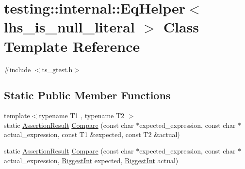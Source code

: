 \hypertarget{classtesting_1_1internal_1_1EqHelper}{\section{testing\-:\-:internal\-:\-:Eq\-Helper$<$ lhs\-\_\-is\-\_\-null\-\_\-literal $>$ Class Template Reference}
\label{classtesting_1_1internal_1_1EqHelper}
}


{\ttfamily \#include $<$ts\-\_\-gtest.\-h$>$}

\subsection*{Static Public Member Functions}
\begin{DoxyCompactItemize}
\item 
{\footnotesize template$<$typename T1 , typename T2 $>$ }\\static \hyperlink{classtesting_1_1AssertionResult}{Assertion\-Result} \hyperlink{classtesting_1_1internal_1_1EqHelper_ac2977ed90cd3c88607f804e43b86b92c}{Compare} (const char $\ast$expected\-\_\-expression, const char $\ast$actual\-\_\-expression, const T1 \&expected, const T2 \&actual)
\item 
static \hyperlink{classtesting_1_1AssertionResult}{Assertion\-Result} \hyperlink{classtesting_1_1internal_1_1EqHelper_a3de996954b41d484c065ed824fe7eac9}{Compare} (const char $\ast$expected\-\_\-expression, const char $\ast$actual\-\_\-expression, \hyperlink{namespacetesting_1_1internal_a05c6bd9ede5ccdf25191a590d610dcc6}{Biggest\-Int} expected, \hyperlink{namespacetesting_1_1internal_a05c6bd9ede5ccdf25191a590d610dcc6}{Biggest\-Int} actual)
\end{DoxyCompactItemize}


